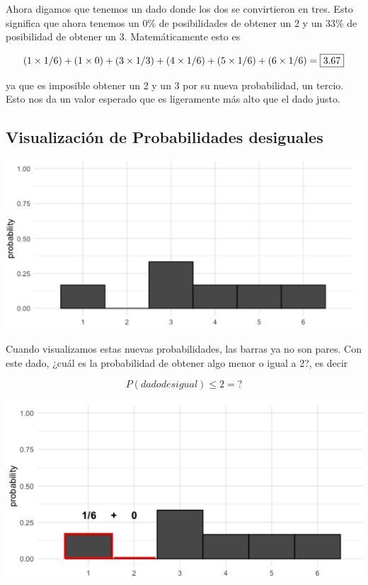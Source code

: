 \documentclass[
  letterpaper,
  DIV=11,
  numbers=noendperiod]{scrreprt}
\begin{document}
Ahora digamos que tenemos un dado donde los dos se convirtieron en tres.
Esto significa que ahora tenemos un 0\% de posibilidades de obtener un 2
y un 33\% de posibilidad de obtener un 3. Matemáticamente esto es

\[
(1\times 1/6) + (1\times 0) + (3\times 1/3) + (4\times 1/6) + (5\times 1/6) + (6\times 1/6) = \fbox{3.67}
\]

ya que es imposible obtener un 2 y un 3 por su nueva probabilidad, un
tercio. Esto nos da un valor esperado que es ligeramente más alto que el
dado justo.

\hypertarget{visualizaciuxf3n-de-probabilidades-desiguales}{%
\subsection{Visualización de Probabilidades
desiguales}\label{visualizaciuxf3n-de-probabilidades-desiguales}}

\includegraphics{fig24.png}

Cuando visualizamos estas nuevas probabilidades, las barras ya no son
pares. Con este dado, ¿cuál es la probabilidad de obtener algo menor o
igual a 2?, es decir

\[
P(dado desigual) \leq 2 = ? 
\]

\includegraphics{fig25.png}
\end{document}
